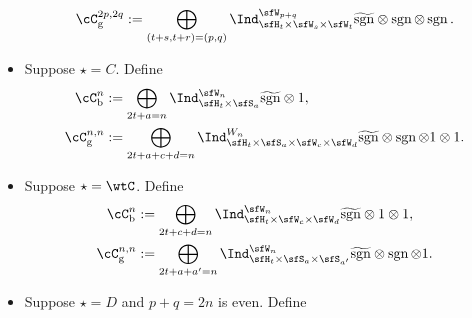 \documentclass[12pt,a4paper]{amsart}
\newcommand{\Res}{\mathrm{Res}}
\newcommand{\sgn}{\operatorname{sgn}}
\numberwithin{equation}{section}
\theoremstyle{remark}
\def\Irr{\mathrm{Irr}}
\def\Cint#1{\Coh_{[#1]}}
\def\bsgn{\overline{\sgn}}
\def\Coh{\mathrm{Coh}}
\def\hsgn{\widetilde{\mathrm{sgn}}}
\begin{document}
\begin{itemize}
\[\begin{split}
          \cC_{\mathrm g}^{2p,2q} %
          &:=\bigoplus_{\substack{(t+s,t+r)=(p,q)}} \Ind_{\sfH_{t} \times \sfW_s\times \sfW_t}^{\sfW_{p+q}}
          \hsgn \otimes \sgn \otimes \sgn.\\
        \end{split}
        \]
  \item Suppose $\star=C$. Define
        \[
        \begin{split}
          \cC_{\mathrm b}^{n} &
          :=\bigoplus_{\substack{2t+a=n}} %
          \Ind_{\sfH_{t} \times \sfS_a}^{\sfW_{n}} \hsgn\otimes 1, %
          \\
          \cC_{\mathrm g}^{n,n} &:= \bigoplus_{2t+a+c+d=n}\Ind_{\sfH_{t} \times \sfS_{a} \times \sfW_c\times \sfW_d}^{W_{n}} \hsgn \otimes
          \sgn \otimes 1 \otimes 1.\\
        \end{split}
        \]
  \item Suppose $\star=\wtC$. Define
        \[
        \begin{split}
          \cC_{\mathrm b}^{n} &
          :=\bigoplus_{\substack{2t+c+d=n}} %
          \Ind_{\sfH_{t} \times \sfW_c\times \sfW_{d}}^{\sfW_{n}} \hsgn\otimes 1 \otimes
          1, %
          \\
          \cC_{\mathrm g}^{n,n} &:= \bigoplus_{2t+a+a'=n}\Ind_{\sfH_{t} \times \sfS_{a} \times \sfS_{a'}}^{\sfW_{n}} \hsgn \otimes
          \sgn \otimes 1. \\
        \end{split}
        \]
  \item Suppose $\star=D$ and $p+q=2n$ is even. Define

\end{itemize}
\end{document}
